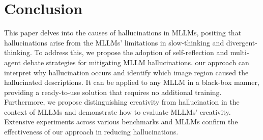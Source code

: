 \documentclass[10pt,twocolumn,letterpaper]{article}
\begin{document}
\section{Conclusion}
This paper delves into the causes of hallucinations in MLLMs, positing that hallucinations arise from the MLLMs' limitations in slow-thinking and divergent-thinking. To address this, we propose the adoption of self-reflection and multi-agent debate strategies for mitigating MLLM hallucinations. our approach can interpret why hallucination occurs and identify which image region caused the hallucinated descriptions. It can be applied to any MLLM in a black-box manner, providing a ready-to-use solution that requires no additional training. Furthermore, we propose distinguishing creativity from hallucination in the context of MLLMs and demonstrate how to evaluate MLLMs' creativity. Extensive experiments across various benchmarks and MLLMs confirm the effectiveness of our approach in reducing hallucinations.


{\small


}
\end{document}
